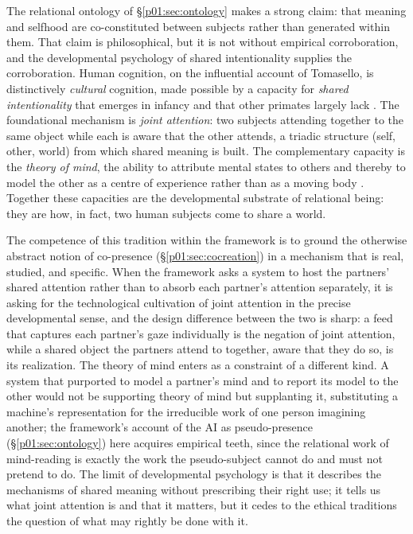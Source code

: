 The relational ontology of §\ref{p01:sec:ontology} makes a strong claim: that meaning and selfhood are co-constituted between subjects rather than generated within them. That claim is philosophical, but it is not without empirical corroboration, and the developmental psychology of shared intentionality supplies the corroboration. Human cognition, on the influential account of Tomasello, is distinctively \emph{cultural} cognition, made possible by a capacity for \emph{shared intentionality} that emerges in infancy and that other primates largely lack \parencite{tomasello1999cultural, tomasello2005intentions}. The foundational mechanism is \emph{joint attention}: two subjects attending together to the same object while each is aware that the other attends, a triadic structure (self, other, world) from which shared meaning is built. The complementary capacity is the \emph{theory of mind}, the ability to attribute mental states to others and thereby to model the other as a centre of experience rather than as a moving body \parencite{premack1978does}. Together these capacities are the developmental substrate of relational being: they are how, in fact, two human subjects come to share a world.

The competence of this tradition within the framework is to ground the otherwise abstract notion of co-presence (§\ref{p01:sec:cocreation}) in a mechanism that is real, studied, and specific. When the framework asks a system to host the partners' shared attention rather than to absorb each partner's attention separately, it is asking for the technological cultivation of joint attention in the precise developmental sense, and the design difference between the two is sharp: a feed that captures each partner's gaze individually is the negation of joint attention, while a shared object the partners attend to together, aware that they do so, is its realization. The theory of mind enters as a constraint of a different kind. A system that purported to model a partner's mind and to report its model to the other would not be supporting theory of mind but supplanting it, substituting a machine's representation for the irreducible work of one person imagining another; the framework's account of the AI as pseudo-presence (§\ref{p01:sec:ontology}) here acquires empirical teeth, since the relational work of mind-reading is exactly the work the pseudo-subject cannot do and must not pretend to do. The limit of developmental psychology is that it describes the mechanisms of shared meaning without prescribing their right use; it tells us what joint attention is and that it matters, but it cedes to the ethical traditions the question of what may rightly be done with it.

